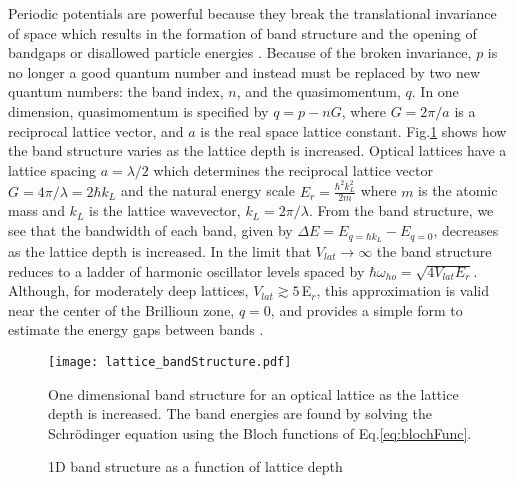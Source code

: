 Periodic potentials are powerful because they break the translational invariance of space which results in the formation of band structure and the opening of bandgaps or disallowed particle energies \cite{Ashcroft1976}. Because of the broken invariance, $p$ is no longer a good quantum number and instead must be replaced by two new quantum numbers: the band index, $n$, and the quasimomentum, $q$. In one dimension, quasimomentum is specified by $q = p - nG$, where $G=2\pi/a$ is a reciprocal lattice vector, and $a$ is the real space lattice constant. Fig.\;\ref{fig:bandStructure} shows how the band structure varies as the lattice depth is increased. Optical lattices have a lattice spacing $a = \lambda /2$ which determines the reciprocal lattice vector $G = 4\pi / \lambda = 2 \hbar k_L$ and the natural energy scale $E_r = \frac{\hbar^2 k_L^2}{2m}$ where $m$ is the atomic mass and $k_L$ is the lattice wavevector, $k_L = 2\pi / \lambda$. From the band structure, we see that the bandwidth of each band, given by $\Delta E = E_{q=\hbar k_L} - E_{q=0}$, decreases as the lattice depth is increased. In the limit that $V_{lat}\!\rightarrow\!\infty$ the band structure reduces to a ladder of harmonic oscillator levels spaced by $\hbar \omega_{ho} = \sqrt{4 V_{lat} E_r}$. Although, for moderately deep lattices, $V_{lat} \gtrsim 5\,$E$_r$, this approximation is valid near the center of the Brillioun zone, $q = 0$, and provides a simple form to estimate the energy gaps between bands \cite{Jaksch1998,Jaksch2005}.


\begin{figure} \label{fig:bandStructure}
	\centerline{
	\texttt{[image: lattice\_bandStructure.pdf]}}
	\caption{1D band structure as a function of lattice depth}{One dimensional band structure for an optical lattice as the lattice depth is increased. The band energies are found by solving the Schr\"{o}dinger equation using the Bloch functions of Eq.\;\ref{eq:blochFunc}.}
\end{figure}
	
